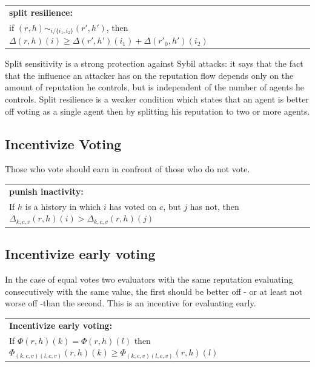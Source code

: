 \documentclass{article}
\newcommand{\flow}{\Phi}
\newenvironment{condition}[1]
	{
	\begin{center}
	   \begin{tabular}{|p{.9\textwidth}|}
		\hline \medskip
		{\bf #1:}\\
	}
	{
		\medskip \\\hline
	\end{tabular}
	\end{center}
	}
\begin{document}
\begin{condition}{split resilience}
if $(r, h) \sim_{i/\{i_1, i_2\}} (r', h')$, then $\Delta(r, h)(i) \geq \Delta(r', h')(i_1) + \Delta(r'_0, h')(i_2)$
\end{condition}

%
Split sensitivity is a strong protection against Sybil attacks: it says that the fact that the influence an attacker has on the reputation flow depends only on the amount of reputation he controls, but is independent of the number of agents he controls. Split resilience is a weaker condition which states that an agent is better off voting as a single agent then by splitting his reputation to two or more agents. 




\subsection{Incentivize Voting}

Those who vote should earn in confront of those who do not vote.
\begin{condition}{punish inactivity}
If $h$ is a history in which $i$ has voted on $c$, but $j$ has not, then
$\Delta_{k, c, v}(r, h)(i) > \Delta_{k, c, v}(r, h)(j)$
\label{condition:punish_non_active}
\end{condition}

\subsection{Incentivize early voting}
In the case of equal votes two evaluators with the same reputation evaluating consecutively with the same value, the first should be better off - or at least not worse off -than the second. This is an incentive for evaluating early.
\begin{condition}{Incentivize early voting}
If $\flow(r, h)(k) = \flow(r, h)(l)$ then $\flow_{(k, c, v)(l,c,v)}(r, h)(k) \geq  \flow_{(k, c, v)(l, c, v)}(r, h)(l)$
\end{condition}
\end{document}
